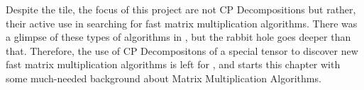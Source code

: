 
Despite the tile, the focus of this project are not CP Decompositions but
rather, their active use in searching for fast matrix multiplication algorithms.
There was a glimpse of these types of algorithms in , but the rabbit hole goes deeper than that. Therefore, the use of CP
Decompositons of a special tensor to discover new fast matrix multiplication
algorithms is left for , and
 starts this chapter with some
much-needed background about Matrix Multiplication Algorithms.



